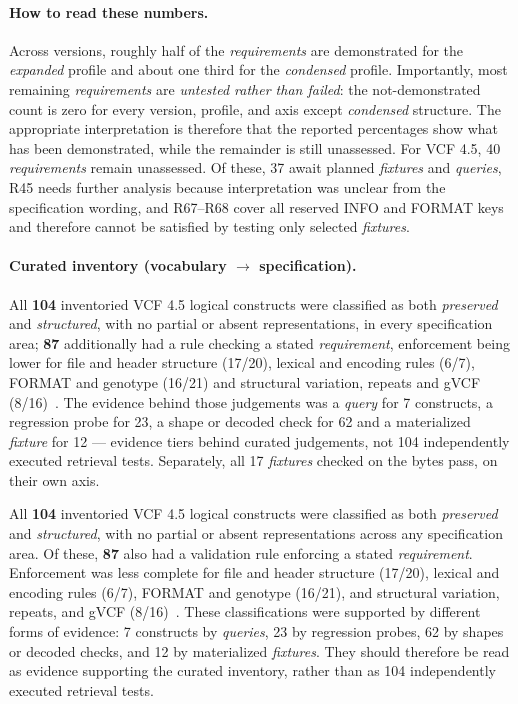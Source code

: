 \paragraph{How to read these numbers.}
Across versions, roughly half of the \emph{requirements} are demonstrated for the \textit{expanded} profile and about one third for the \textit{condensed} profile. 
Importantly, most remaining \emph{requirements} are \emph{untested rather than failed}: the not-demonstrated count is zero for every version, profile, and axis except \textit{condensed} structure. 
The appropriate interpretation is therefore that the reported percentages show what has been demonstrated, while the remainder is still unassessed.
For VCF 4.5, 40 \emph{requirements} remain unassessed. 
Of these, 37 await planned \emph{fixtures} and \emph{queries}, R45 needs further analysis because interpretation was unclear from the specification wording, and R67--R68 cover all reserved INFO and FORMAT keys and therefore cannot be satisfied by testing only selected \emph{fixtures}.

\paragraph{Curated inventory (vocabulary $\rightarrow$ specification).}
All \textbf{104} inventoried VCF 4.5 logical constructs were classified as both \emph{preserved} and \emph{structured}, with no partial or absent representations, in every specification area; \textbf{87} additionally had a rule checking a stated \emph{requirement}, enforcement being lower for file and header structure (17/20), lexical and encoding rules (6/7), FORMAT and genotype (16/21) and structural variation, repeats and gVCF (8/16)~\cite{vcfc210}.
The evidence behind those judgements was a \emph{query} for 7 constructs, a regression probe for 23, a shape or decoded check for 62 and a materialized \emph{fixture} for 12 --- evidence tiers behind curated judgements, not 104 independently executed retrieval tests.
Separately, all 17 \emph{fixtures} checked on the bytes pass, on their own axis.

All \textbf{104} inventoried VCF 4.5 logical constructs were classified as both \emph{preserved} and \emph{structured}, with no partial or absent representations across any specification area. 
Of these, \textbf{87} also had a validation rule enforcing a stated \emph{requirement}. 
Enforcement was less complete for file and header structure (17/20), lexical and encoding rules (6/7), FORMAT and genotype (16/21), and structural variation, repeats, and gVCF (8/16)~\cite{vcfc210}.
These classifications were supported by different forms of evidence: 7 constructs by \emph{queries}, 23 by regression probes, 62 by shapes or decoded checks, and 12 by materialized \emph{fixtures}. 
They should therefore be read as evidence supporting the curated inventory, rather than as 104 independently executed retrieval tests.


